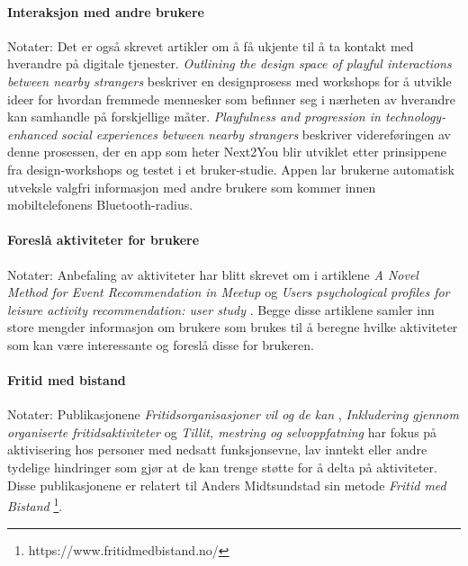 \paragraph{Interaksjon med andre brukere}
Notater:
Det er også skrevet artikler om å få ukjente til å ta kontakt med hverandre på digitale tjenester. {\em Outlining the design space of playful interactions between nearby strangers} \cite{NEARBY:5:AM16} beskriver en designprosess med workshops for å utvikle ideer for hvordan fremmede mennesker som befinner seg i nærheten av hverandre kan samhandle på forskjellige måter. {\em Playfulness and progression in technology-enhanced social experiences between nearby strangers} \cite{PLAYFUL:6:NORDICHI18} beskriver videreføringen av denne prosessen, der en app som heter Next2You blir utviklet etter prinsippene fra design-workshops og testet i et bruker-studie. Appen lar brukerne automatisk utveksle valgfri informasjon med andre brukere som kommer innen mobiltelefonens Bluetooth-radius.

\paragraph{Foreslå aktiviteter for brukere}
Notater:
Anbefaling av aktiviteter har blitt skrevet om i artiklene {\em A Novel Method for Event Recommendation in Meetup} \cite{MEETUP:7:ASONAM17} og {\em Users psychological profiles for leisure activity recommendation: user study} \cite{PROFILES:10:CITREC17}. Begge disse artiklene samler inn store mengder informasjon om brukere som brukes til å beregne hvilke aktiviteter som kan være interessante og foreslå disse for brukeren.

\paragraph{Fritid med bistand}
Notater:
Publikasjonene {\em Fritidsorganisasjoner vil og de kan} \cite{FRITID:12}, {\em Inkludering gjennom organiserte fritidsaktiviteter} \cite{INKLUDERING:11} og {\em Tillit, mestring og selvoppfatning} \cite{TILLIT:13} har fokus på aktivisering hos personer med nedsatt funksjonsevne, lav inntekt eller andre tydelige hindringer som gjør at de kan trenge støtte for å delta på aktiviteter. Disse publikasjonene er relatert til Anders Midtsundstad sin metode {\em Fritid med Bistand} \footnote{https://www.fritidmedbistand.no/}. 
